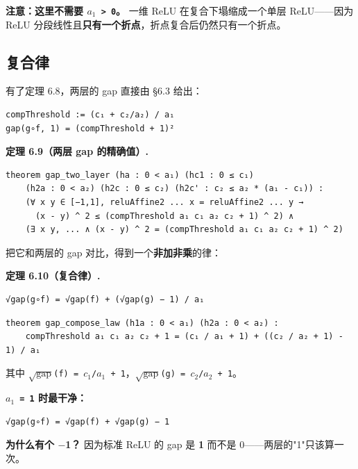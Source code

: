 \documentclass[11pt,a4paper]{ctexart}
\begin{document}
\textbf{注意：这里不需要 \texttt{\ensuremath{a_{1}} > 0}。} 一维 ReLU 在复合下塌缩成一个单层 ReLU——因为 ReLU 分段线性且\textbf{只有一个折点}，折点复合后仍然只有一个折点。

\subsection{复合律}

有了定理 6.8，两层的 gap 直接由 §6.3 给出：

\begin{lstlisting}
compThreshold := (c₁ + c₂/a₂) / a₁
gap(g∘f, 1) = (compThreshold + 1)²
\end{lstlisting}

\textbf{定理 6.9（两层 gap 的精确值）.}

\begin{lstlisting}
theorem gap_two_layer (ha : 0 < a₁) (hc1 : 0 ≤ c₁)
    (h2a : 0 < a₂) (h2c : 0 ≤ c₂) (h2c' : c₂ ≤ a₂ * (a₁ - c₁)) :
    (∀ x y ∈ [−1,1], reluAffine2 ... x = reluAffine2 ... y →
      (x - y) ^ 2 ≤ (compThreshold a₁ c₁ a₂ c₂ + 1) ^ 2) ∧
    (∃ x y, ... ∧ (x - y) ^ 2 = (compThreshold a₁ c₁ a₂ c₂ + 1) ^ 2)
\end{lstlisting}

把它和两层的 gap 对比，得到一个\textbf{非加非乘}的律：

\textbf{定理 6.10（复合律）.}

\begin{lstlisting}
√gap(g∘f) = √gap(f) + (√gap(g) − 1) / a₁
\end{lstlisting}

\begin{lstlisting}
theorem gap_compose_law (h1a : 0 < a₁) (h2a : 0 < a₂) :
    compThreshold a₁ c₁ a₂ c₂ + 1 = (c₁ / a₁ + 1) + ((c₂ / a₂ + 1) - 1) / a₁
\end{lstlisting}

其中 \texttt{\ensuremath{\sqrt{\mathrm{gap}}}(f) = \ensuremath{c_{1}}/\ensuremath{a_{1}} + 1}，\texttt{\ensuremath{\sqrt{\mathrm{gap}}}(g) = \ensuremath{c_{2}}/\ensuremath{a_{2}} + 1}。

\textbf{\texttt{\ensuremath{a_{1}} = 1} 时最干净：}

\begin{lstlisting}
√gap(g∘f) = √gap(f) + √gap(g) − 1
\end{lstlisting}

\textbf{为什么有个 \ensuremath{-}1？} 因为标准 ReLU 的 gap 是 \textbf{1} 而不是 0——两层的"1"只该算一次。
\end{document}
